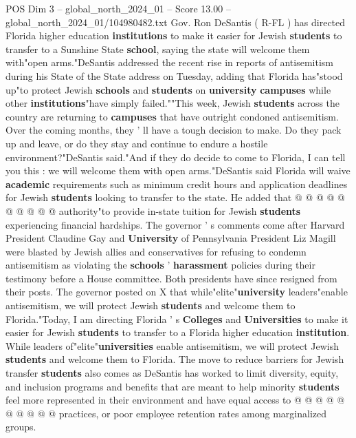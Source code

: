\begin{textsample}{POS Dim 3 – global\_north\_2024\_01 – Score 13.00 – global\_north\_2024\_01/104980482.txt}  \label{ex:f3_pos_245}
Gov.
Ron DeSantis ( R-FL ) has directed Florida higher education \textbf{institutions} to make it easier for Jewish \textbf{students} to transfer to a Sunshine State \textbf{school}, saying the state will welcome them with"open arms."DeSantis addressed the recent rise in reports of antisemitism during his State of the State address on Tuesday, adding that Florida has"stood up"to protect Jewish \textbf{schools} and \textbf{students} on \textbf{university} \textbf{campuses} while other \textbf{institutions}"have simply failed.""This week, Jewish \textbf{students} across the country are returning to \textbf{campuses} that have outright condoned antisemitism.
Over the coming months, they ' ll have a tough decision to make.
Do they pack up and leave, or do they stay and continue to endure a hostile environment?"DeSantis said."And if they do decide to come to Florida, I can tell you this : we will welcome them with open arms."DeSantis said Florida will waive \textbf{academic} requirements such as minimum credit hours and application deadlines for Jewish \textbf{students} looking to transfer to the state.
He added that @ @ @ @ @ @ @ @ @ @ authority"to provide in-state tuition for Jewish \textbf{students} experiencing financial hardships.
The governor ' s comments come after Harvard President Claudine Gay and \textbf{University} of Pennsylvania President Liz Magill were blasted by Jewish allies and conservatives for refusing to condemn antisemitism as violating the \textbf{schools} ' \textbf{harassment} policies during their testimony before a House committee.
Both presidents have since resigned from their posts.
The governor posted on X that while"elite"\textbf{university} leaders"enable antisemitism, we will protect Jewish \textbf{students} and welcome them to Florida."Today, I am directing Florida ' s \textbf{Colleges} and \textbf{Universities} to make it easier for Jewish \textbf{students} to transfer to a Florida higher education \textbf{institution}.
While leaders of"elite"\textbf{universities} enable antisemitism, we will protect Jewish \textbf{students} and welcome them to Florida.
The move to reduce barriers for Jewish transfer \textbf{students} also comes as DeSantis has worked to limit diversity, equity, and inclusion programs and benefits that are meant to help minority \textbf{students} feel more represented in their environment and have equal access to @ @ @ @ @ @ @ @ @ @ practices, or poor employee retention rates among marginalized groups.

\end{textsample}
